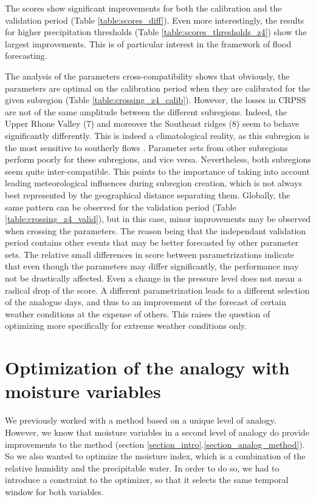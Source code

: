 \documentclass[5p]{elsarticle}
\begin{document}
The scores show significant improvements for both the calibration and the validation period (Table \ref{table:scores_diff}). Even more interestingly, the results for higher precipitation thresholds (Table \ref{table:scores_thresholds_z4}) show the largest improvements. This is of particular interest in the framework of flood forecasting.

The analysis of the parameters cross-compatibility shows that obviously, the parameters are optimal on the calibration period when they are calibrated for the given subregion (Table \ref{table:crossing_z4_calib}). However, the losses in CRPSS are not of the same amplitude between the different subregions. Indeed, the Upper Rhone Valley (7) and moreover the Southeast ridges (8) seem to behave significantly differently. This is indeed a climatological reality, as this subregion is the most sensitive to southerly flows \citep{Horton2012}. Parameter sets from other subregions perform poorly for these subregions, and vice versa. Nevertheless, both subregions seem quite inter-compatible. This points to the importance of taking into account leading meteorological influences during subregion creation, which is not always best represented by the geographical distance separating them. Globally, the same pattern can be observed for the validation period (Table \ref{table:crossing_z4_valid}), but in this case, minor improvements may be observed when crossing the parameters. The reason being that the independant validation period contains other events that may be better forecasted by other parameter sets. The relative small differences in score between parametrizations indicate that even though the parameters may differ significantly, the performance may not be drastically affected. Even a change in the pressure level does not mean a radical drop of the score. A different parametrization leads to a different selection of the analogue days, and thus to an improvement of the forecast of certain weather conditions at the expense of others. This raises the question of optimizing more specifically for extreme weather conditions only. 


\section{Optimization of the analogy with moisture variables}

We previously worked with a method based on a unique level of analogy. However, we know that moisture variables in a second level of analogy do provide improvements to the method (section \ref{section_intro}.\ref{section_analog_method}). So we also wanted to optimize the moisture index, which is a combination of the relative humidity and the precipitable water. In order to do so, we had to introduce a constraint to the optimizer, so that it selects the same temporal window for both variables. 
\end{document}
